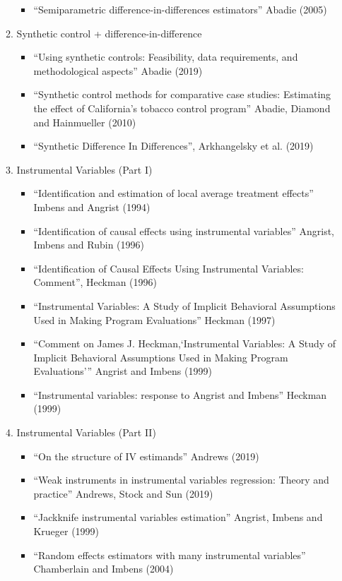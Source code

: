 \documentclass[11pt, a4paper]{article}
\begin{document}
\begin{enumerate}
\begin{enumerate}
\begin{itemize}
    \item ``Semiparametric difference-in-differences estimators'' Abadie (2005)
    \end{itemize}
  \item Synthetic control + difference-in-difference
    \begin{itemize}
    \item ``Using synthetic controls: Feasibility, data requirements, and methodological aspects'' Abadie (2019)
    \item ``Synthetic control methods for comparative case studies: Estimating the effect of California’s tobacco control program'' Abadie, Diamond and Hainmueller (2010)
    \item ``Synthetic Difference In Differences'', Arkhangelsky et al. (2019)
    \end{itemize}
  \item Instrumental Variables (Part I)
    \begin{itemize}
    \item ``Identification and estimation of local average treatment effects'' Imbens and Angrist (1994)
    \item ``Identification of causal effects using instrumental variables'' Angrist, Imbens and Rubin (1996)
    \item ``Identification of Causal Effects Using Instrumental Variables: Comment'', Heckman (1996)
    \item ``Instrumental Variables: A Study of Implicit Behavioral Assumptions Used in Making Program Evaluations'' Heckman (1997)
    \item ``Comment on James J. Heckman,`Instrumental Variables: A Study of Implicit Behavioral Assumptions Used in Making Program Evaluations''' Angrist and Imbens (1999)
    \item ``Instrumental variables: response to Angrist and Imbens'' Heckman (1999)
    \end{itemize}
  \item Instrumental Variables (Part II)
    \begin{itemize}
    \item ``On the structure of IV estimands'' Andrews (2019)
    \item ``Weak instruments in instrumental variables regression: Theory and practice'' Andrews, Stock and Sun (2019)
    \item ``Jackknife instrumental variables estimation'' Angrist, Imbens and Krueger (1999)
    \item ``Random effects estimators with many instrumental variables'' Chamberlain and Imbens (2004)

\end{itemize}
\end{enumerate}
\end{enumerate}
\end{document}
